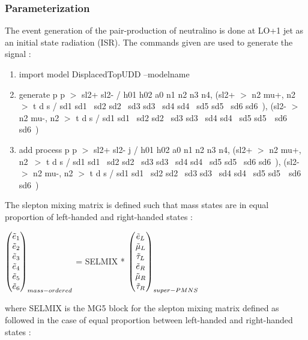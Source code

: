 \documentclass{cernatlasnote}
\begin{document}
\subsubsection{Parameterization}

The event generation of the pair-production of neutralino is done at LO+1 jet as an initial state radiation (ISR).
The commands given are used to generate the signal : 
\begin{enumerate}
    \item import model DisplacedTopUDD --modelname
    \item generate p p  $>$ sl2+ sl2- / h01 h02 a0 n1 n2 n3 n4, (sl2+ $>$ n2 mu+, n2\
 $>$ t d s / sd1 sd1~ sd2 sd2~ sd3 sd3~ sd4 sd4~ sd5 sd5~ sd6 sd6~), (sl2- $>$ n2 mu-, n2 $>$ t d s / sd1 sd1~ sd2 sd2~ sd3 sd3~ sd4 sd4~ sd5 sd5~\
 sd6 sd6~)  
    \item add process p p  $>$ sl2+ sl2- j / h01 h02 a0 n1 n2 n3 n4, (sl2+ $>$ n2 mu+, n2\
 $>$ t d s / sd1 sd1~ sd2 sd2~ sd3 sd3~ sd4 sd4~ sd5 sd5~ sd6 sd6~), (sl2- $>$ n2 mu-, n2 $>$ t d s / sd1 sd1~ sd2 sd2~ sd3 sd3~ sd4 sd4~ sd5 sd5~\
 sd6 sd6~) 
\end{enumerate}

  The slepton mixing matrix is defined such that mass states are in equal proportion of left-handed and right-handed states :
\begin{center}
 $\begin{pmatrix}
  \Tilde{e}_{1} \\ 
  \Tilde{e}_{2}  \\
  \Tilde{e}_{3} \\
  \Tilde{e}_{4} \\
  \Tilde{e}_{5}  \\
  \Tilde{e}_{6} \\
\end{pmatrix}_{mass-ordered}$ = SELMIX *  $\begin{pmatrix}
  \Tilde{e}_{L} \\ 
  \Tilde{\mu}_{L}  \\
  \Tilde{\tau}_{L} \\
  \Tilde{e}_{R} \\
  \Tilde{\mu}_{R}  \\
  \Tilde{\tau}_{R} \\
\end{pmatrix}_{super-PMNS}$
\end{center}
where SELMIX is the MG5 block for the slepton mixing matrix \cite{Allanach_2009} defined as followed in the case of equal proportion between left-handed and right-handed states :
\end{document}
